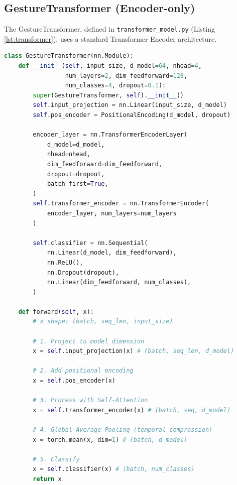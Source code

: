 \documentclass[]{IEEEphot}
\begin{document}
\subsection{GestureTransformer (Encoder-only)}
The GestureTransformer, defined in \texttt{transformer\_model.py} (Listing \ref{lst:transformer}), uses a standard Transformer Encoder architecture.

\begin{lstlisting}[language=Python, caption={GestureTransformer (Encoder-only) class definition.}, label={lst:transformer}, captionpos=t]
class GestureTransformer(nn.Module):
    def __init__(self, input_size, d_model=64, nhead=4, 
                 num_layers=2, dim_feedforward=128, 
                 num_classes=4, dropout=0.1):
        super(GestureTransformer, self).__init__()
        self.input_projection = nn.Linear(input_size, d_model)
        self.pos_encoder = PositionalEncoding(d_model, dropout)
        
        encoder_layer = nn.TransformerEncoderLayer(
            d_model=d_model,
            nhead=nhead,
            dim_feedforward=dim_feedforward,
            dropout=dropout,
            batch_first=True,
        )
        self.transformer_encoder = nn.TransformerEncoder(
            encoder_layer, num_layers=num_layers
        )
        
        self.classifier = nn.Sequential(
            nn.Linear(d_model, dim_feedforward),
            nn.ReLU(),
            nn.Dropout(dropout),
            nn.Linear(dim_feedforward, num_classes),
        )

    def forward(self, x):
        # x shape: (batch, seq_len, input_size)
        
        # 1. Project to model dimension
        x = self.input_projection(x) # (batch, seq_len, d_model)
        
        # 2. Add positional encoding
        x = self.pos_encoder(x)
        
        # 3. Process with Self-Attention
        x = self.transformer_encoder(x) # (batch, seq, d_model)
        
        # 4. Global Average Pooling (temporal compression)
        x = torch.mean(x, dim=1) # (batch, d_model)
        
        # 5. Classify
        x = self.classifier(x) # (batch, num_classes)
        return x
\end{lstlisting}
\end{document}

